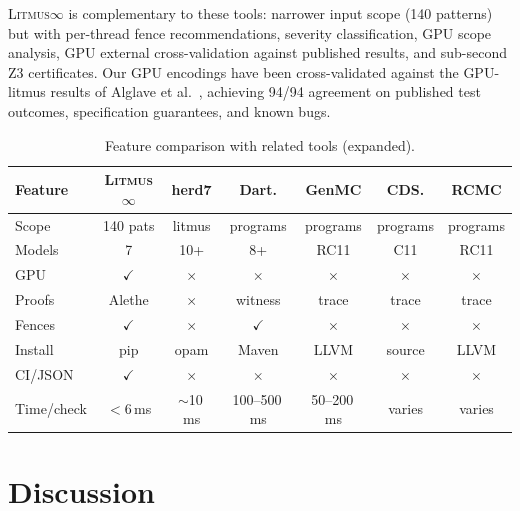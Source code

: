 \documentclass[11pt]{article}
\newcommand{\litmus}{\textsc{Litmus$\infty$}}
\newcommand{\cmark}{$\checkmark$}
\newcommand{\xmark}{$\times$}
\begin{document}
\litmus{} is complementary to these tools: narrower input scope
(140 patterns) but with per-thread fence recommendations, severity
classification, GPU scope analysis, GPU external cross-validation
against published results, and sub-second Z3 certificates.
Our GPU encodings have been cross-validated against the GPU-litmus
results of Alglave et al.~\cite{Alglave2015GPU}, achieving 94/94
agreement on published test outcomes, specification guarantees,
and known bugs.

\begin{table}[ht]
\centering
\caption{Feature comparison with related tools (expanded).}
\label{tab:comparison}
\small
\begin{tabular}{lcccccc}
\toprule
\textbf{Feature} & \textbf{\litmus{}} & \textbf{herd7} & \textbf{Dart.}
& \textbf{GenMC} & \textbf{CDS.} & \textbf{RCMC} \\
\midrule
Scope & 140 pats & litmus & programs & programs & programs & programs \\
Models & 7 & 10+ & 8+ & RC11 & C11 & RC11 \\
GPU & \cmark & \xmark & \xmark & \xmark & \xmark & \xmark \\
Proofs & Alethe & \xmark & witness & trace & trace & trace \\
Fences & \cmark & \xmark & \cmark & \xmark & \xmark & \xmark \\
Install & pip & opam & Maven & LLVM & source & LLVM \\
CI/JSON & \cmark & \xmark & \xmark & \xmark & \xmark & \xmark \\
Time/check & $<$6\,ms & ${\sim}$10\,ms & 100--500\,ms & 50--200\,ms & varies & varies \\
\bottomrule
\end{tabular}
\end{table}

\section{Discussion}
\label{sec:discussion}
\end{document}
